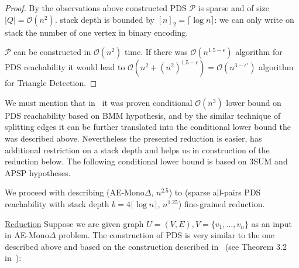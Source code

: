 \documentclass[12pt]{article}
\begin{document}
\begin{proof}
By the observations above constructed PDS $\mathcal{P}$ is sparse and of size $|Q| = \mathcal{O}(n^2)$. stack depth is bounded by $[n]_2 = \lceil \log n \rceil$: we can only write on stack the number of one vertex in binary encoding.

$\mathcal{P}$ can be constructed in $\mathcal{O}(n^2)$ time. If there was $\mathcal{O}(n^{1.5 - \epsilon})$ algorithm for PDS reachability it would lead to $\mathcal{O}(n^2 + (n^2)^{1.5 - \epsilon}) = \mathcal{O}(n^{3 - \epsilon'})$ algorithm for Triangle Detection.
\end{proof}

We must mention that in~\cite{10.1145/3158118} it was proven conditional $\mathcal{O}(n^3)$ lower bound on PDS reachability based on BMM hypothesis, and by the similar technique of splitting edges it can be further translated into the conditional lower bound the was described above. Nevertheless the presented reduction is easier, has additional restriction on a stack depth and helps us in construction of the reduction below. The following conditional lower bound is based on 3SUM and APSP hypotheses.

We proceed with describing (AE-Mono$\Delta$, $n^{2.5}$) to (sparse all-pairs PDS reachability with stack depth $b = 4 \lceil \log n \rceil$, $n^{1.25}$) fine-grained reduction.

\underline{Reduction} Suppose we are given graph $U = (V, E), V = \{v_1, \ldots, v_n\}$ as an input in AE-Mono$\Delta$ problem. The construction of PDS is very similar to the one described above and based on the construction described in~\cite{10.1145/3571252} (see Theorem 3.2 in~\cite{10.1145/3571252}):
\end{document}
